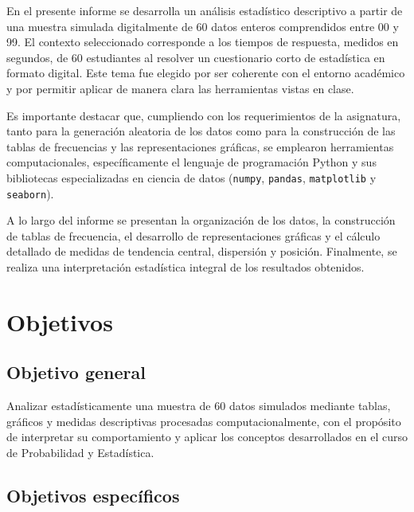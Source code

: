 \documentclass[12pt,letterpaper]{article}
\begin{document}
En el presente informe se desarrolla un análisis estadístico descriptivo a partir de una muestra simulada digitalmente de 60 datos enteros comprendidos entre 00 y 99. El contexto seleccionado corresponde a los tiempos de respuesta, medidos en segundos, de 60 estudiantes al resolver un cuestionario corto de estadística en formato digital. Este tema fue elegido por ser coherente con el entorno académico y por permitir aplicar de manera clara las herramientas vistas en clase.

Es importante destacar que, cumpliendo con los requerimientos de la asignatura, tanto para la generación aleatoria de los datos como para la construcción de las tablas de frecuencias y las representaciones gráficas, se emplearon herramientas computacionales, específicamente el lenguaje de programación Python y sus bibliotecas especializadas en ciencia de datos (\texttt{numpy}, \texttt{pandas}, \texttt{matplotlib} y \texttt{seaborn}).

A lo largo del informe se presentan la organización de los datos, la construcción de tablas de frecuencia, el desarrollo de representaciones gráficas y el cálculo detallado de medidas de tendencia central, dispersión y posición. Finalmente, se realiza una interpretación estadística integral de los resultados obtenidos.

\section{Objetivos}

\subsection{Objetivo general}

Analizar estadísticamente una muestra de 60 datos simulados mediante tablas, gráficos y medidas descriptivas procesadas computacionalmente, con el propósito de interpretar su comportamiento y aplicar los conceptos desarrollados en el curso de Probabilidad y Estadística.

\subsection{Objetivos específicos}
\end{document}
